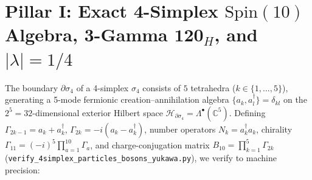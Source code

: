 \documentclass[11pt,a4paper]{article}
\begin{document}
\section{\texorpdfstring{Pillar I: Exact 4-Simplex $\mathrm{Spin}(10)$ Algebra, 3-Gamma $\mathbf{120}_H$, and $|\lambda| = 1/4$}{Pillar I: Exact 4-Simplex Spin(10) Algebra, 3-Gamma 120\_H, and |lambda| = 1/4}}
The boundary $\partial\sigma_4$ of a 4-simplex $\sigma_4$ consists of $5$ tetrahedra ($k \in \{1,\dots,5\}$), generating a 5-mode fermionic creation--annihilation algebra $\{a_k, a_l^\dagger\} = \delta_{kl}$ on the $2^5 = 32$-dimensional exterior Hilbert space $\mathcal{H}_{\partial\sigma_4} = \Lambda^\bullet(\mathbb{C}^5)$. Defining $\Gamma_{2k-1} = a_k + a_k^\dagger$, $\Gamma_{2k} = -i(a_k - a_k^\dagger)$, number operators $N_k = a_k^\dagger a_k$, chirality $\Gamma_{11} = (-i)^5 \prod_{a=1}^{10}\Gamma_a$, and charge-conjugation matrix $B_{10} = \prod_{k=1}^5 \Gamma_{2k}$ (\texttt{verify\_4simplex\_particles\_bosons\_yukawa.py}), we verify to machine precision:
\end{document}
